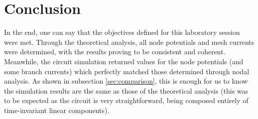 \section{Conclusion}
\label{sec:conclusion}

\par
In the end, one can say that the objectives defined for this laboratory session were met.
Through the theoretical analysis, all node potentials and mesh currents were determined, with the results proving to be consistent and coherent.
Meanwhile, the circuit simulation returned values for the node potentials (and some branch currents) which perfectly matched those determined through nodal analysis. As shown in subsection \ref{sec:comparison}, this is enough for us to know the simulation results are the same as those of the theoretical analysis (this was to be expected as the circuit is very straightforward, being composed entirely of time-invariant linear components).

